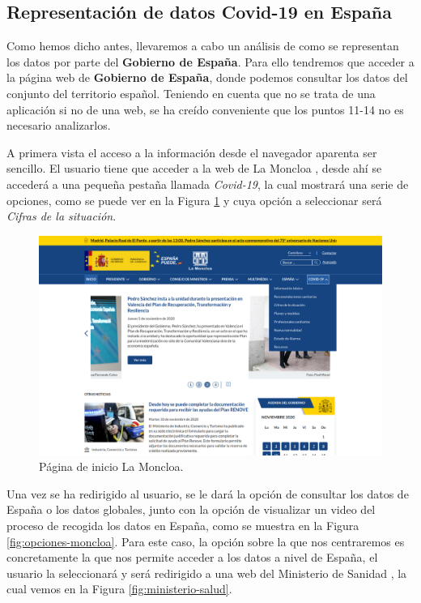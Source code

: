 \subsection{Representación de datos Covid-19 en España}

Como hemos dicho antes, llevaremos a cabo un análisis de como se representan los datos por parte del \textbf{Gobierno de España}. Para ello tendremos que acceder a la página web de \textbf{Gobierno de España}, donde podemos consultar los datos del conjunto del territorio español. Teniendo en cuenta que no se trata de una aplicación si no de una web, se ha creído conveniente que los puntos 11-14 no es necesario analizarlos.

A primera vista el acceso a la información desde el navegador aparenta ser sencillo. El usuario tiene que acceder a la web de La Moncloa \cite{la-moncloa}, desde ahí se accederá a una pequeña pestaña llamada \textit{Covid-19}, la cual mostrará una serie de opciones, como se puede ver en la Figura \ref{fig:inicio-moncloa} y cuya opción a seleccionar será \textit{Cifras de la situación}.

\begin{figure}[H]
	\centering
	\includegraphics[width=1\textwidth]{img/inicio-moncloa}
	\caption{Página de inicio La Moncloa.}
	\label{fig:inicio-moncloa}
\end{figure}

\newpage
Una vez se ha redirigido al usuario, se le dará la opción de consultar los datos de España o los datos globales, junto con la opción de visualizar un video del proceso de recogida los datos en España, como se muestra en la Figura \ref{fig:opciones-moncloa}. Para este caso, la opción sobre la que nos centraremos es concretamente la que nos permite acceder a los datos a nivel de España, el usuario la seleccionará y será redirigido a una web del Ministerio de Sanidad \cite{gob-espana}, la cual vemos en la Figura \ref{fig:ministerio-salud}.

